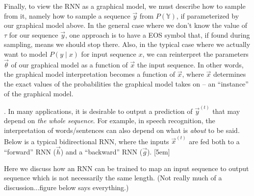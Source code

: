 \documentclass[11pt]{article}
\begin{document}
Finally, to view the RNN as a graphical model, we must describe how to sample from it, namely how to sample a sequence $\vec{y}$ from $P(\mathbb{Y})$, if parameterized by our graphical model above. In the general case where we don't know the value of $\tau$ for our sequence $\vec{y}$, one approach is to have a EOS symbol that, if found during sampling, means we should stop there. Also, in the typical case where we actually want to model $P(y \mid x)$ for input sequence $x$, we can reinterpret the parameters $\vec{\theta}$ of our graphical model as a function of $\vec{x}$ the input sequence. In other words, the graphical model interpretation becomes a function of $\vec{x}$, where $\vec{x}$ determines the exact values of the probabilities the graphical model takes on -- an ``instance'' of the graphical model.






\myspace
\p {}. In many applications, it is desirable to output a prediction of $\vec{y}^{(t)}$ that may depend on \textit{the whole sequence}. For example, in speech recognition, the interpretation of words/sentences can also depend on what is \textit{about} to be said. Below is a typical bidirectional RNN, where the inputs $\vec{x}^(t)$ are fed both to a ``forward'' RNN ($\vec{h}$) and a ``backward'' RNN ($\vec{g}$). [5em]


\myspace\myspace{}
\p {} Here we discuss how an RNN can be trained to map an input sequence to output sequence which is not necessarily the same length. (Not really much of a discussion...figure below says everything.)


\myspace\myspace{}
\end{document}
